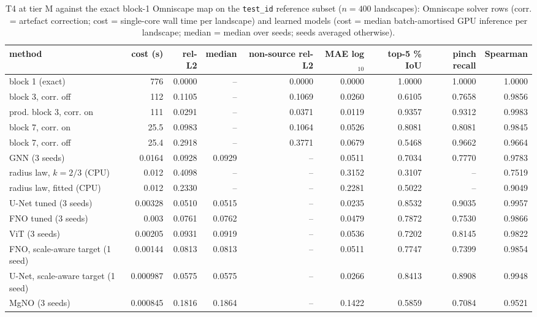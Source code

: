 \begin{table}[tb]
\centering
\scriptsize
\setlength{\tabcolsep}{3.5pt}
\caption{T4 at tier M against the exact block-1 Omniscape map on the \texttt{test\_id} reference subset ($n = 400$ landscapes): Omniscape solver rows (corr. = artefact correction; cost = single-core wall time per landscape) and learned models (cost = median batch-amortised GPU inference per landscape; median = median over seeds; seeds averaged otherwise).}
\label{tab:pareto_M}
\setlength{\tabcolsep}{2.2pt}
\begin{tabular}{lrrrrrrrr}
\toprule
method & cost (s) & rel-L2 & median & non-source rel-L2 & MAE log$_{10}$ & top-5 \% IoU & pinch recall & Spearman \\
\midrule
block 1 (exact) & 776 & 0.0000 & -- & 0.0000 & 0.0000 & 1.0000 & 1.0000 & 1.0000 \\
block 3, corr. off & 112 & 0.1105 & -- & 0.1069 & 0.0260 & 0.6105 & 0.7658 & 0.9856 \\
prod. block 3, corr. on & 111 & 0.0291 & -- & 0.0371 & 0.0119 & 0.9357 & 0.9312 & 0.9983 \\
block 7, corr. on & 25.5 & 0.0983 & -- & 0.1064 & 0.0526 & 0.8081 & 0.8081 & 0.9845 \\
block 7, corr. off & 25.4 & 0.2918 & -- & 0.3771 & 0.0679 & 0.5468 & 0.9662 & 0.9664 \\
GNN (3 seeds) & 0.0164 & 0.0928 & 0.0929 & -- & 0.0511 & 0.7034 & 0.7770 & 0.9783 \\
radius law, $k=2/3$ (CPU) & 0.012 & 0.4098 & -- & -- & 0.3152 & 0.3107 & -- & 0.7519 \\
radius law, fitted (CPU) & 0.012 & 0.2330 & -- & -- & 0.2281 & 0.5022 & -- & 0.9049 \\
U-Net tuned (3 seeds) & 0.00328 & 0.0510 & 0.0515 & -- & 0.0235 & 0.8532 & 0.9035 & 0.9957 \\
FNO tuned (3 seeds) & 0.003 & 0.0761 & 0.0762 & -- & 0.0479 & 0.7872 & 0.7530 & 0.9866 \\
ViT (3 seeds) & 0.00205 & 0.0931 & 0.0919 & -- & 0.0536 & 0.7202 & 0.8145 & 0.9822 \\
FNO, scale-aware target (1 seed) & 0.00144 & 0.0813 & 0.0813 & -- & 0.0511 & 0.7747 & 0.7399 & 0.9854 \\
U-Net, scale-aware target (1 seed) & 0.000987 & 0.0575 & 0.0575 & -- & 0.0266 & 0.8413 & 0.8908 & 0.9948 \\
MgNO (3 seeds) & 0.000845 & 0.1816 & 0.1864 & -- & 0.1422 & 0.5859 & 0.7084 & 0.9521 \\
\bottomrule
\end{tabular}
\end{table}
